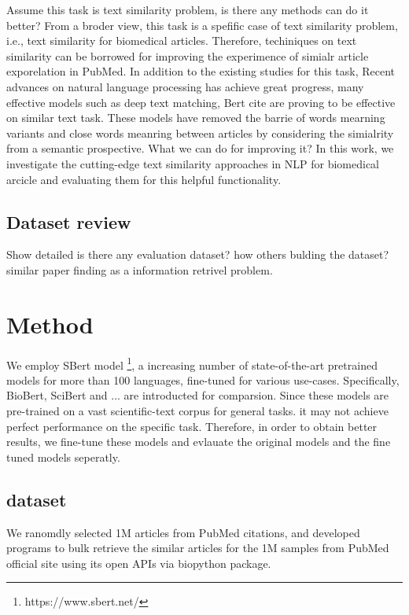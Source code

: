 \documentclass[11pt]{article}
\begin{document}
    Assume this task is text similarity problem, is there any methods can do it better?
    From a broder view, this task is a spefific case of text similarity problem, i.e., text similarity for biomedical articles. Therefore, techiniques on text similarity can be borrowed for improving the experimence of simialr article exporelation in PubMed.
    In addition to the existing studies for this task, Recent advances on natural language processing has achieve great progress, many effective models such as deep text matching, Bert cite are proving to be effective on similar text task.
    These models have removed the barrie of words mearning variants and close words meanring between articles by considering the simialrity from a semantic prospective.
    What we can do for improving it?
    In this work, we investigate the cutting-edge text similarity approaches in NLP for biomedical arcicle and evaluating them for this helpful functionality.

    \subsection{Dataset review}
    Show detailed is there any evaluation dataset?
    how others bulding the dataset?
    similar paper finding as a information retrivel problem.

    \section{Method}
    We employ SBert model \footnote{https://www.sbert.net/}, a increasing number of state-of-the-art pretrained models for more than 100 languages, fine-tuned for various use-cases.
    Specifically, BioBert, SciBert and ... are introducted  for comparsion. Since these models are pre-trained on a vast scientific-text corpus for general tasks. it may not achieve perfect performance on the specific task. Therefore,
    in order to obtain better results, we fine-tune these models and evlauate the original models and the fine tuned models seperatly.



    \subsection{dataset}
    We ranomdly selected 1M articles from PubMed citations, and developed programs to bulk retrieve the similar articles for the 1M samples from PubMed official site using its open APIs via biopython \cite{10.1093/bioinformatics/btp163} package.
\end{document}

